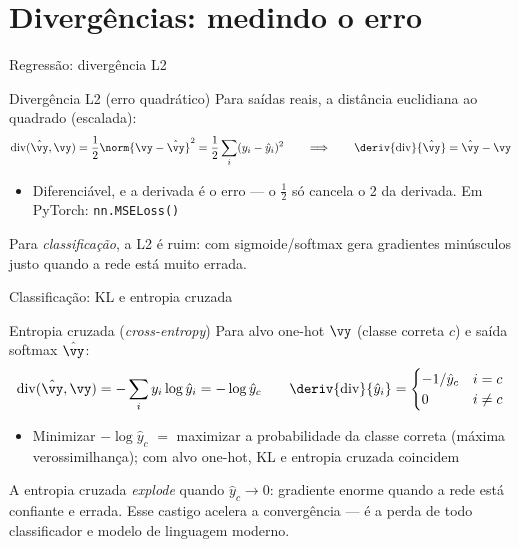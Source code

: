 \documentclass[aspectratio=169, 11pt]{beamer}
\begin{document}
\section{Divergências: medindo o erro}

\begin{frame}{Regressão: divergência L2}
  \begin{defbox}{Divergência L2 (erro quadrático)}
    Para saídas reais, a distância euclidiana ao quadrado (escalada):
    \[
      \mathrm{div}(\hat{\vy}, \vy) = \frac{1}{2} \norm{\vy - \hat{\vy}}^2
             = \frac{1}{2} \sum_i (y_i - \hat{y}_i)^2
      \qquad\Longrightarrow\qquad
      \deriv{\mathrm{div}}{\hat{\vy}} = \hat{\vy} - \vy
    \]
  \end{defbox}

  \begin{itemize}\setlength{\itemsep}{0.2ex}
    \item Diferenciável, e a derivada é o \alert{erro} — o $\tfrac{1}{2}$ só
          cancela o 2 da derivada. Em PyTorch: \texttt{nn.MSELoss()}
  \end{itemize}

  \begin{alertabox}
    Para \emph{classificação}, a L2 é ruim: com sigmoide/softmax gera
    gradientes minúsculos justo quando a rede está muito errada.
  \end{alertabox}
\end{frame}

\begin{frame}{Classificação: KL e entropia cruzada}
  \begin{defbox}{Entropia cruzada (\emph{cross-entropy})}
    Para alvo one-hot $\vy$ (classe correta $c$) e saída softmax $\hat{\vy}$:
    \[
      \mathrm{div}(\hat{\vy}, \vy)
        = -\sum_i y_i \log \hat{y}_i
        = -\log \hat{y}_c
      \qquad
      \deriv{\mathrm{div}}{\hat{y}_i} =
        \begin{cases} -1/\hat{y}_c & i = c \\ 0 & i \neq c \end{cases}
    \]
  \end{defbox}

  \begin{itemize}\setlength{\itemsep}{0.2ex}
    \item Minimizar $-\log \hat{y}_c$ $=$ maximizar a probabilidade da classe
          correta (máxima verossimilhança); com alvo one-hot, KL e entropia
          cruzada \alert{coincidem}
  \end{itemize}

  \begin{ideiabox}
    A entropia cruzada \emph{explode} quando $\hat{y}_c \to 0$: gradiente
    enorme quando a rede está confiante e errada. Esse castigo acelera a
    convergência — é a perda de todo classificador e modelo de linguagem moderno.
  \end{ideiabox}
\end{frame}
\end{document}
